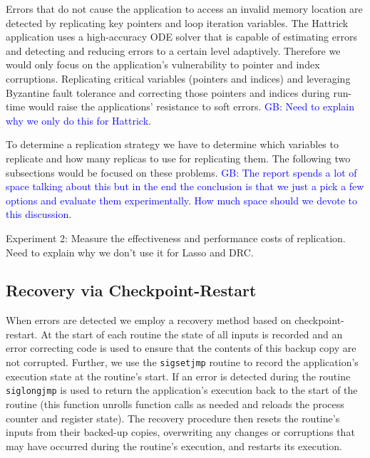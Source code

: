 \documentclass[prodmode,acmtecs]{acmconf} %
\newcommand{\greg}[1]{%
  \textcolor{blue}{GB: #1}
}
\begin{document}
Errors that do not cause the application to access an invalid memory location are detected by replicating key pointers and loop iteration variables.
The Hattrick application uses a high-accuracy ODE solver that is capable of estimating errors and detecting and reducing errors to a certain level adaptively.
Therefore we would only focus on the application's vulnerability to pointer and index corruptions.
Replicating critical variables (pointers and indices) and leveraging Byzantine fault tolerance and correcting those pointers and indices during run-time would raise the applications' resistance to soft errors.
\greg{Need to explain why we only do this for Hattrick.}

To determine a replication strategy we have to determine which variables to replicate and how many replicas to use for replicating them. The following two subsections would be focused on these problems.
\greg{The report spends a lot of space talking about this but in the end the conclusion is that we just a pick a few options and evaluate them experimentally. How much space should we devote to this discussion.}

Experiment 2: Measure the effectiveness and performance costs of replication. Need to explain why we don't use it for Lasso and DRC.

\subsection{Recovery via Checkpoint-Restart}
\label{sec:res_tech:cr}

When errors are detected we employ a recovery method based on checkpoint-restart.
At the start of each routine the state of all inputs is recorded and an error correcting code is used to ensure that the contents of this backup copy are not corrupted.
Further, we use the \texttt{sigsetjmp} routine to record the application's execution state at the routine's start.
If an error is detected during the routine \texttt{siglongjmp} is used to return the application's execution back to the start of the routine (this function unrolls function calls as needed and reloads the process counter and register state).
The recovery procedure then resets the routine's inputs from their backed-up copies, overwriting any changes or corruptions that may have occurred during the routine's execution, and restarts its execution.
\end{document}
